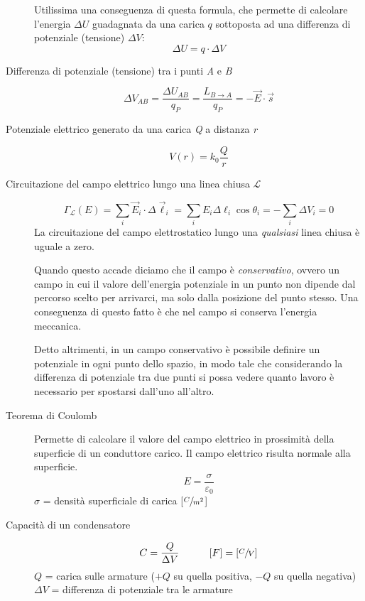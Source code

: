 \documentclass[a4paper,11pt,italian]{article}
\begin{document}
\begin{description}
  Utilissima una conseguenza di questa formula, che permette di calcolare l'energia $ \Delta U $ guadagnata da una carica $ q $ sottoposta ad una differenza di potenziale (tensione) $ \Delta V $:
  \[ \Delta U = q \cdot \Delta V \]
  
  \item[Differenza di potenziale (tensione) tra i punti \textit{A} e \textit{B}]
  \[  \Delta V_{AB} = \frac{\Delta U_{AB}}{q_P} = \frac{L_{B \rightarrow A}}{q_P} = - \vec{E} \cdot \vec{s} \]
  
  \item[Potenziale elettrico generato da una carica \textit{Q} a distanza \textit{r}]
  \[ V(r) = k_0 \frac{Q}{r}  \]
  
  \item[Circuitazione del campo elettrico lungo una linea chiusa  $ \mathscr{L} $]\label{conc:circuitazioneE}
  \[ \Gamma_\mathscr{L}(E) = \sum_i  \vec{E}_i \cdot \Delta\vec{\ell}_i = \sum_i E_i \Delta \ell_i \cos \theta_i = - \sum_i \Delta V_i = 0 \]
  La circuitazione del campo elettrostatico lungo una \emph{qualsiasi} linea chiusa è uguale a zero.
  
  Quando questo accade diciamo che il campo è \emph{conservativo}, ovvero un campo in cui il valore dell'energia potenziale in un punto non dipende dal percorso scelto per arrivarci, ma solo dalla posizione del punto stesso. Una conseguenza di questo fatto è che nel campo si conserva l'energia meccanica.
  
  Detto altrimenti, in un campo conservativo è possibile definire un potenziale in ogni punto dello spazio, in modo tale che considerando la differenza di potenziale tra due punti si possa vedere quanto lavoro è necessario per spostarsi dall'uno all'altro. 
  
  \item[Teorema di Coulomb] 
  Permette di calcolare il valore del campo elettrico in prossimità della superficie di un conduttore carico. Il campo elettrico risulta normale alla superficie.
  \[ E = \frac{\sigma}{\varepsilon_0} \]
  $ \sigma $ = densità superficiale di carica [$ \sfrac{C}{m^2} $]
  
  \item[Capacità di un condensatore]
  \[ C = \frac{Q}{\Delta V} \hspace*{3em} [F] = \left[ \sfrac{C}{V} \right] \]
  $ Q $ = carica sulle armature ($ +Q $ su quella positiva, $ -Q $ su quella negativa)\\
  $ \Delta V $ = differenza di potenziale tra le armature
  

\end{description}
\end{document}
